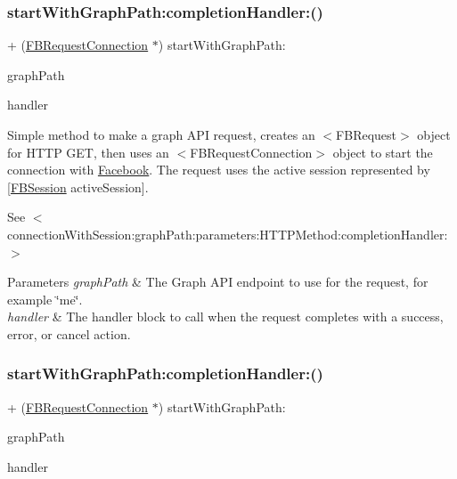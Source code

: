 \subsubsection{\texorpdfstring{start\+With\+Graph\+Path\+:completion\+Handler\+:()}{startWithGraphPath:completionHandler:()}\hspace{0.1cm}{\footnotesize\ttfamily [1/5]}}
{\footnotesize\ttfamily + (\hyperlink{interfaceFBRequestConnection}{F\+B\+Request\+Connection} $\ast$) start\+With\+Graph\+Path\+: \begin{DoxyParamCaption}\item[{(N\+S\+String $\ast$)}]{graph\+Path }\item[{completionHandler:(F\+B\+Request\+Handler)}]{handler }\end{DoxyParamCaption}}

Simple method to make a graph A\+PI request, creates an $<$\+F\+B\+Request$>$ object for H\+T\+TP G\+ET, then uses an $<$\+F\+B\+Request\+Connection$>$ object to start the connection with \hyperlink{interfaceFacebook}{Facebook}. The request uses the active session represented by {\ttfamily \mbox{[}\hyperlink{interfaceFBSession}{F\+B\+Session} active\+Session\mbox{]}}.

See $<$connection\+With\+Session\+:graph\+Path\+:parameters\+:\+H\+T\+T\+P\+Method\+:completion\+Handler\+:$>$


\begin{DoxyParams}{Parameters}
{\em graph\+Path} & The Graph A\+PI endpoint to use for the request, for example \char`\"{}me\char`\"{}. \\
\hline
{\em handler} & The handler block to call when the request completes with a success, error, or cancel action. \\
\hline
\end{DoxyParams}
\mbox{\label{interfaceFBRequestConnection_ad5b57e64c614dcb04a71e62ee11a87d5}} 
\subsubsection{\texorpdfstring{start\+With\+Graph\+Path\+:completion\+Handler\+:()}{startWithGraphPath:completionHandler:()}\hspace{0.1cm}{\footnotesize\ttfamily [2/5]}}
{\footnotesize\ttfamily + (\hyperlink{interfaceFBRequestConnection}{F\+B\+Request\+Connection} $\ast$) start\+With\+Graph\+Path\+: \begin{DoxyParamCaption}\item[{(N\+S\+String $\ast$)}]{graph\+Path }\item[{completionHandler:(F\+B\+Request\+Handler)}]{handler }\end{DoxyParamCaption}}

